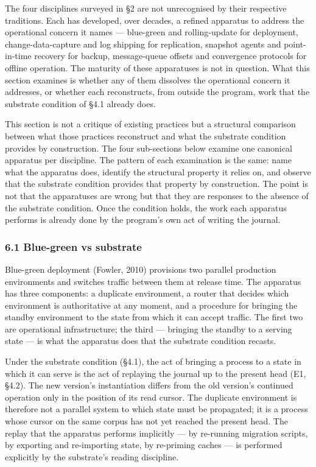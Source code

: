 \documentclass[
]{article}
\begin{document}
The four disciplines surveyed in §2 are not unrecognised by their
respective traditions. Each has developed, over decades, a refined
apparatus to address the operational concern it names --- blue-green and
rolling-update for deployment, change-data-capture and log shipping for
replication, snapshot agents and point-in-time recovery for backup,
message-queue offsets and convergence protocols for offline operation.
The maturity of these apparatuses is not in question. What this section
examines is whether any of them dissolves the operational concern it
addresses, or whether each reconstructs, from outside the program, work
that the substrate condition of §4.1 already does.

This section is not a critique of existing practices but a structural
comparison between what those practices reconstruct and what the
substrate condition provides by construction. The four sub-sections
below examine one canonical apparatus per discipline. The pattern of
each examination is the same: name what the apparatus does, identify the
structural property it relies on, and observe that the substrate
condition provides that property by construction. The point is not that
the apparatuses are wrong but that they are responses to the absence of
the substrate condition. Once the condition holds, the work each
apparatus performs is already done by the program's own act of writing
the journal.

\subsubsection{6.1 Blue-green vs
substrate}\label{blue-green-vs-substrate}

Blue-green deployment (Fowler, 2010) provisions two parallel production
environments and switches traffic between them at release time. The
apparatus has three components: a duplicate environment, a router that
decides which environment is authoritative at any moment, and a
procedure for bringing the standby environment to the state from which
it can accept traffic. The first two are operational infrastructure; the
third --- bringing the standby to a serving state --- is what the
apparatus does that the substrate condition recasts.

Under the substrate condition (§4.1), the act of bringing a process to a
state in which it can serve is the act of replaying the journal up to
the present head (E1, §4.2). The new version's instantiation differs
from the old version's continued operation only in the position of its
read cursor. The duplicate environment is therefore not a parallel
system to which state must be propagated; it is a process whose cursor
on the same corpus has not yet reached the present head. The replay that
the apparatus performs implicitly --- by re-running migration scripts,
by exporting and re-importing state, by re-priming caches --- is
performed explicitly by the substrate's reading discipline.
\end{document}
